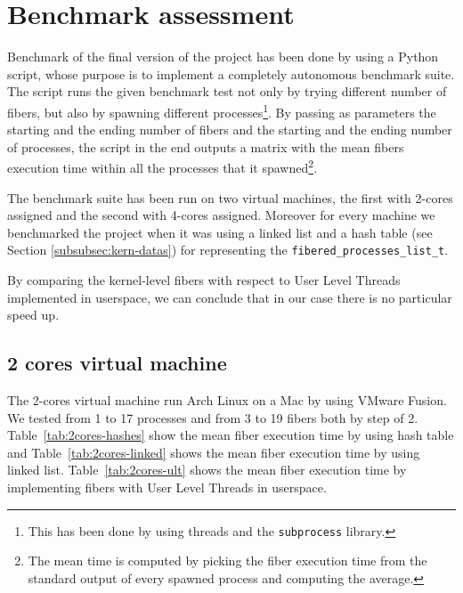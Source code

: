 \documentclass[a4paper,10pt]{article}
\begin{document}
\section{Benchmark assessment}
 Benchmark of the final version of the project has been done by using a Python script, whose purpose is to implement a completely autonomous benchmark suite. The script runs the given benchmark test not only by trying different number of fibers, but also by spawning different processes\footnote{This has been done by using threads and the \lstinline{subprocess} library.}. By passing as parameters the starting and the ending number of fibers and the starting and the ending number of processes, the script in the end outputs a matrix with the mean fibers execution time within all the processes that it spawned\footnote{The mean time is computed by picking the fiber execution time from the standard output of every spawned process and computing the average.}.

 The benchmark suite has been run on two virtual machines, the first with 2-cores assigned and the second with 4-cores assigned. Moreover for every machine we benchmarked the project when it was using a linked list and a hash table (see Section \ref{subsubsec:kern-datas}) for representing the \lstinline{fibered_processes_list_t}.

 By comparing the kernel-level fibers with respect to User Level Threads implemented in userspace, we can conclude that in our case there is no particular speed up.

\subsection{2 cores virtual machine}
  The 2-cores virtual machine run Arch Linux on a Mac by using VMware Fusion. We tested from 1 to 17 processes and from 3 to 19 fibers both by step of 2. Table~\ref{tab:2cores-hashes} show the mean fiber execution time by using hash table and Table~\ref{tab:2cores-linked} shows the mean fiber execution time by using linked list. Table~\ref{tab:2cores-ult} shows the mean fiber execution time by implementing fibers with User Level Threads in userspace.
\end{document}
